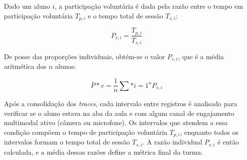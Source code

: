 Dado um aluno $i$, a participação voluntária é dada pela razão entre o tempo em participação voluntária $T_{p,i}$ e o tempo total de sessão $T_{s,i}$:

\begin{equation}\label{eq:voluntary_participation_student}
P_{v,i} = \frac{T_{p,i}}{T_{s,i}}
\end{equation}

De posse das proporções individuais, obtém-se o valor $P_{v,i}$, que é a média aritmética dos $n$ alunos:

\begin{equation}\label{eq:voluntary_participation_avg}
\bar{P}*v = \frac{1}{n} \sum*{i=1}^{n} P_{v,i}
\end{equation}

% 

Após a consolidação dos \textit{traces}, cada intervalo entre registros é analisado para verificar se o aluno estava na aba da aula e com algum canal de engajamento multimodal ativo (câmera ou microfone). Os intervalos que atendem a essa condição compõem o tempo de participação voluntária $T_{p,i}$, enquanto todos os intervalos formam o tempo total de sessão $T_{s,i}$. A razão individual $P_{v,i}$ é então calculada, e a média dessas razões define a métrica final da turma.



